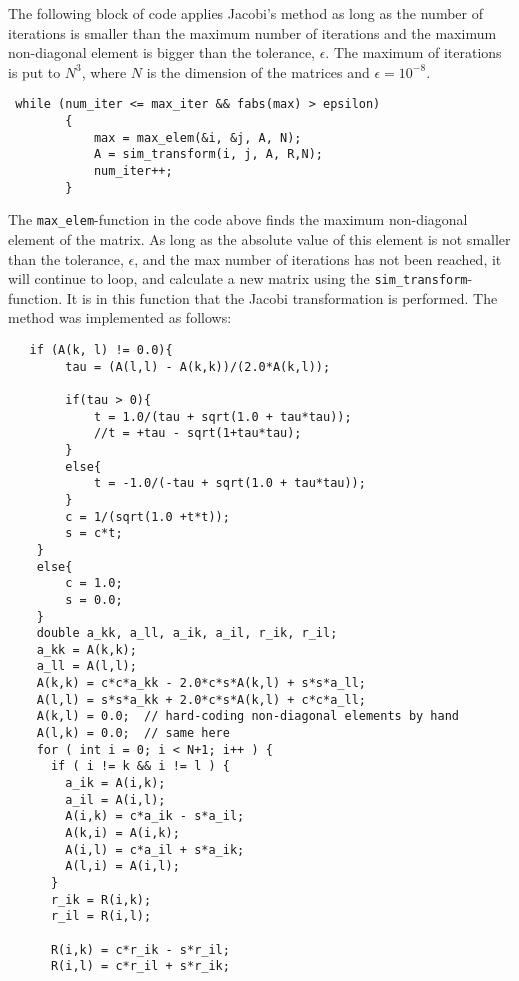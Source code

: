 \documentclass[12pt]{article}
\begin{document}
The following block of code applies Jacobi's method as long as the number of iterations is smaller than the maximum number of iterations and the maximum non-diagonal element is bigger than the tolerance, $\epsilon$. The maximum of iterations is put to $N^3$, where $N$ is the dimension of the matrices and $\epsilon = 10^{-8}$. 

\begin{lstlisting}
 while (num_iter <= max_iter && fabs(max) > epsilon)
        {
            max = max_elem(&i, &j, A, N);
            A = sim_transform(i, j, A, R,N);
            num_iter++;
        }
\end{lstlisting}
The \lstinline{max_elem}-function in the code above finds the maximum non-diagonal element of the matrix. As long as the absolute value of this element is not smaller than the tolerance, $\epsilon$, and the max number of iterations has not been reached, it will continue to loop, and calculate a new matrix using the \lstinline{sim_transform}-function. It is in this function that the Jacobi transformation is performed. The method was implemented as follows:
\newline
\begin{lstlisting}
   if (A(k, l) != 0.0){
        tau = (A(l,l) - A(k,k))/(2.0*A(k,l));

        if(tau > 0){
            t = 1.0/(tau + sqrt(1.0 + tau*tau));
            //t = +tau - sqrt(1+tau*tau);
        }
        else{
            t = -1.0/(-tau + sqrt(1.0 + tau*tau));
        }
        c = 1/(sqrt(1.0 +t*t));
        s = c*t;
    }
    else{
        c = 1.0;
        s = 0.0;
    }
    double a_kk, a_ll, a_ik, a_il, r_ik, r_il;
    a_kk = A(k,k);
    a_ll = A(l,l);
    A(k,k) = c*c*a_kk - 2.0*c*s*A(k,l) + s*s*a_ll;
    A(l,l) = s*s*a_kk + 2.0*c*s*A(k,l) + c*c*a_ll;
    A(k,l) = 0.0;  // hard-coding non-diagonal elements by hand
    A(l,k) = 0.0;  // same here
    for ( int i = 0; i < N+1; i++ ) {
      if ( i != k && i != l ) {
        a_ik = A(i,k);
        a_il = A(i,l);
        A(i,k) = c*a_ik - s*a_il;
        A(k,i) = A(i,k);
        A(i,l) = c*a_il + s*a_ik;
        A(l,i) = A(i,l);
      }
      r_ik = R(i,k);
      r_il = R(i,l);

      R(i,k) = c*r_ik - s*r_il;
      R(i,l) = c*r_il + s*r_ik;
\end{lstlisting}
\end{document}
